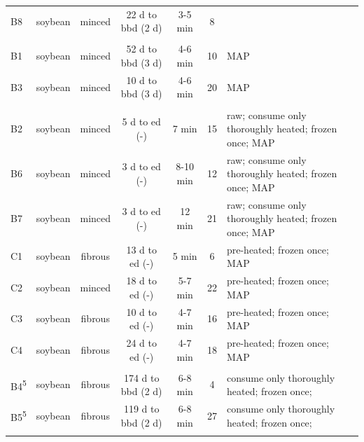 \documentclass[preprint,3p,
a4paper]{elsarticle} %
\begin{document}
\begin{ThreePartTable}
\begin{longtable}[b]{lccccc>{\raggedright\arraybackslash}p{12em}}
\hspace{1em}B8 & soybean & minced & 22 d to bbd (2 d) & 3-5 min & 8 & \\
\addlinespace[0.3em]
\multicolumn{7}{l}{\textit{Manufacturer 04}}\\
\hspace{1em}B1 & soybean & minced & 52 d to bbd (3 d) & 4-6 min & 10 & MAP\\
\hspace{1em}B3 & soybean & minced & 10 d to bbd (3 d) & 4-6 min & 20 & MAP\\
\addlinespace[0.3em]
\multicolumn{7}{l}{\textit{Manufacturer 05}}\\
\hspace{1em}B2 & soybean & minced & 5 d to ed (-) & 7 min & 15 & raw; consume only thoroughly heated; frozen once; MAP\\
\hspace{1em}B6 & soybean & minced & 3 d to ed (-) & 8-10 min & 12 & raw; consume only thoroughly heated; frozen once; MAP\\
\hspace{1em}B7 & soybean & minced & 3 d to ed (-) & 12 min & 21 & raw; consume only thoroughly heated; frozen once; MAP\\
\hspace{1em}C1 & soybean & fibrous & 13 d to ed (-) & 5 min & 6 & pre-heated; frozen once; MAP\\
\hspace{1em}C2 & soybean & minced & 18 d to ed (-) & 5-7 min & 22 & pre-heated; frozen once; MAP\\
\hspace{1em}C3 & soybean & fibrous & 10 d to ed (-) & 4-7 min & 16 & pre-heated; frozen once; MAP\\
\hspace{1em}C4 & soybean & fibrous & 24 d to ed (-) & 4-7 min & 18 & pre-heated; frozen once; MAP\\
\addlinespace[0.3em]
\multicolumn{7}{l}{\textit{Manufacturer 06}}\\
\hspace{1em}B4\textsuperscript{5} & soybean & fibrous & 174 d to bbd (2 d) & 6-8 min & 4 & consume only thoroughly heated; frozen once;\\
\hspace{1em}B5\textsuperscript{5} & soybean & fibrous & 119 d to bbd (2 d) & 6-8 min & 27 & consume only thoroughly heated; frozen once;\\
\addlinespace[0.3em]
\multicolumn{7}{l}{\textit{Manufacturer 07}}\\

\end{longtable}
\end{ThreePartTable}
\end{document}
